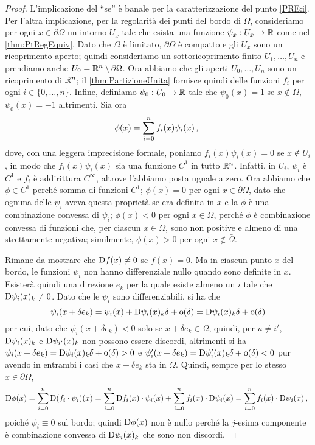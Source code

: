 \begin{proof}
	L'implicazione del ``se'' è banale per la caratterizzazione del punto \cref{PRE:i}. Per l'altra implicazione, per la regolarità dei punti
	del bordo di $\Omega$, consideriamo per ogni $x\in\partial \Omega$ un intorno $U_x$ tale che esista una funzione $\psi_x:U_x\rightarrow \mathbb R$
	come nel \cref{thm:PtRegEquiv}. Dato che $\Omega$ è limitato, $\partial\Omega$ è compatto e gli $U_x$ sono un ricoprimento aperto;
	quindi consideriamo un sottoricoprimento finito $U_1, \dots, U_n$  e prendiamo anche $U_0 = \mathbb R^n \setminus \partial \Omega$.
	Ora abbiamo che gli aperti $U_0,\dots,U_n$ sono un ricoprimento di $\mathbb R^n$;
	il \cref{thm:PartizioneUnita} fornisce quindi delle funzioni $f_i$ per ogni $i\in\{0,\dots, n\}$.
	Infine, definiamo $\psi_0:U_0\rightarrow \mathbb R$ tale che $\psi_0(x)=1$ se $x\notin \Omega$, $\psi_0(x)=-1$ altrimenti. Sia ora 
	\[
		\phi(x)=\sum_{i=0}^n f_i(x) \psi_i(x)\, \text{, }
	\]
	dove, con una leggera imprecisione formale, poniamo $f_i(x) \psi_i(x) = 0$ se $x\notin U_i$, in modo che $f_i(x) \psi_i(x)$ sia una funzione
	$C^1$ in tutto $\mathbb R^n$. Infatti, in $U_i$, $\psi_i$ è $C^1$ e $f_i$ è addirittura $C^{\infty}$, altrove l'abbiamo posta uguale a zero.
	Ora abbiamo che $\phi\in C^1$ perché somma di funzioni $C^1$; $\phi(x)=0$ per ogni $x\in \partial\Omega$, dato che ognuna delle
	$\psi_i$ aveva questa proprietà se era definita in $x$ e la $\phi$ è una combinazione convessa di $\psi_i$;
	$\phi(x)<0$ per ogni $x \in \Omega$, perché $\phi$ è combinazione convessa di funzioni che, per ciascun $x\in\Omega$, sono non positive e
	almeno di una strettamente negativa; similmente, $\phi(x)>0$ per ogni $x \notin \bar{\Omega}$.
	
	Rimane da mostrare che $\mathrm D f(x)\neq 0$ se $f(x)=0$. Ma in ciascun punto $x$ del bordo, le funzioni $\psi_i$ non hanno differenziale nullo
	quando sono definite in $x$. Esisterà quindi una direzione $e_k$ per la quale esiste almeno un $i$ tale che $\mathrm D \psi_i(x)_k\neq 0$. Dato che
	le $\psi_i$ sono differenziabili, si ha che
	\[
		\psi_i(x+\delta e_k)=\psi_i(x)+\mathrm D \psi_i(x)_k \delta + \mathrm{o}(\delta) = \mathrm D \psi_i(x)_k \delta + \mathrm{o}(\delta)
	\]
	per cui, dato che $\psi_i(x+\delta e_k)<0$ solo se $x+\delta e_k\in \Omega$, quindi, per $u\neq i'$, $\mathrm D \psi_i(x)_k$ e
	$\mathrm D \psi_{i'}(x)_k$ non possono essere discordi, altrimenti si ha $\psi_i(x+\delta e_k)= \mathrm D \psi_i(x)_k \delta + \mathrm{o}(\delta)>0$ e
	$\psi_i'(x+\delta e_k)=\mathrm D \psi_i'(x)_k \delta + \mathrm{o}(\delta)<0$ pur avendo in entrambi i casi
	che $x+\delta e_k$ sta in $\Omega$. Quindi, sempre per lo stesso $x\in\partial \Omega$,
	\[ 
		\mathrm D \phi(x)=\sum_{i=0}^n \mathrm D (f_i \cdot\psi_i)(x)=\sum_{i=0}^n \mathrm D f_i(x)\cdot \psi_i(x)+\sum_{i=0}^n f_i(x)\cdot \mathrm D \psi_i(x)=
		\sum_{i=0}^n f_i(x)\cdot \mathrm D  \psi_i(x)\, \text{, }
	\]
	poiché $\psi_i\equiv 0$ sul bordo; quindi $\mathrm D \phi(x)$ non è nullo perché la $j$-esima componente è combinazione convessa di
	$\mathrm D \psi_i(x)_k$ che sono non discordi.
\end{proof}

